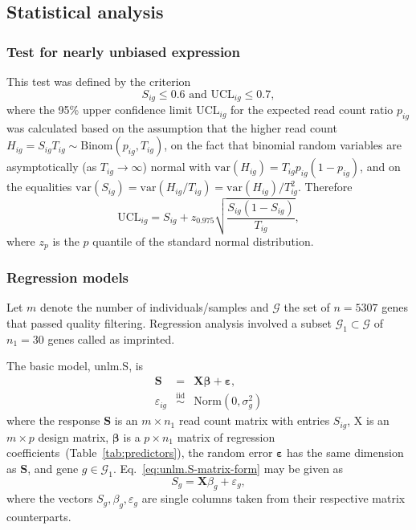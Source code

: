 \documentclass[letterpaper]{article}
\begin{document}
\subsection{Statistical analysis}

\subsubsection{Test for nearly unbiased expression}

This test was defined by the criterion
\begin{equation}
S_{ig} \le 0.6 \text{ and } \mathrm{UCL}_{ig} \le 0.7,
\label{eq:unbiased-test}
\end{equation}
where the 95\% upper confidence limit \(\mathrm{UCL}_{ig}\) for the expected
read count ratio \(p_{ig}\) was calculated based on the assumption
that the higher read count \(H_{ig}=S_{ig}T_{ig}\sim \mathrm{Binom}(p_{ig},
T_{ig})\), on the fact that binomial random variables are
asymptotically (as \(T_{ig}\rightarrow \infty\)) normal with
\(\mathrm{var}(H_{ig}) = T_{ig}p_{ig}(1-p_{ig})\), and on the equalities
\(\mathrm{var}(S_{ig}) = \mathrm{var}(H_{ig}/T_{ig}) =
\mathrm{var}(H_{ig})/T_{ig}^2\).  Therefore
\begin{equation}
\mathrm{UCL}_{ig} = S_{ig} + z_{0.975} \sqrt{\frac{S_{ig} (1 - S_{ig})}{T_{ig}}},
\end{equation}
where $z_{p}$ is the $p$ quantile of the standard normal distribution.

\subsubsection{Regression models}
\label{sec:methods-regression}

Let \(m\) denote the number of individuals/samples and \(\mathcal{G}\) the set
of \(n=5307\) genes that passed quality filtering.  Regression analysis
involved a subset \(\mathcal{G}_1\subset\mathcal{G}\) of \(n_1=30\) genes
called as imprinted.

The basic model, unlm.S, is
\begin{eqnarray}
\mathbf{S} &=& \mathbf{X} \boldsymbol{\beta} + \boldsymbol{\varepsilon},
\label{eq:unlm.S-matrix-form} \\
\varepsilon_{ig} &\overset{\mathrm{iid}}{\sim}& \mathrm{Norm}(0, \sigma^2_g)
\end{eqnarray}
where the response \(\mathbf{S}\) is an \(m\times n_1\) read count matrix with
entries \(S_{ig}\), \(\mathrm{X}\) is an \(m\times p\) design matrix,
\(\boldsymbol{\beta}\) is a \(p\times n_1\) matrix of regression
coefficients~(Table~\ref{tab:predictors}), the random error
\(\boldsymbol{\varepsilon}\) has the same dimension as \(\mathbf{S}\), and
gene \(g\in \mathcal{G}_1\).  Eq.~\ref{eq:unlm.S-matrix-form} may be given as
\begin{equation}
S_g = \mathbf{X} \beta_g + \varepsilon_g,
\label{eq:unlm.S-vector-form}
\end{equation}
where the vectors \(S_g, \beta_g, \varepsilon_g\)
are single columns taken from their respective matrix counterparts.
\end{document}
